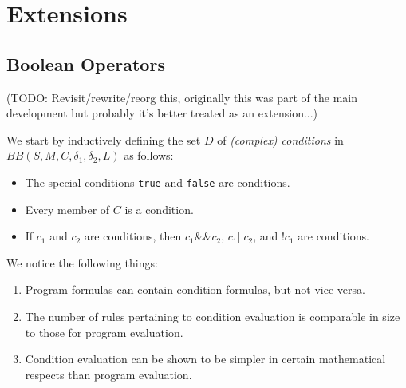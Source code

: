 \documentclass[11pt]{article}
\begin{document}
\begin{comment}
\newtheorem*{determinism}{Theorem}
\begin{determinism}
The evaluation of a Generalized While program is deterministic.
\end{determinism}

\begin{proof}
(TODO: PROVE)
\end{proof}

\newtheorem*{passisuniquelynormal}{Theorem}
\begin{passisuniquelynormal}
No program except for \texttt{pass} is normal.
\end{passisuniquelynormal}

\begin{proof}
(TODO: Do proof...)
\end{proof}

\end{comment}

\section{Extensions}

\subsection{Boolean Operators}

(TODO: Revisit/rewrite/reorg this, originally this was part of the main development but probably it's better treated as an extension...)

We start by inductively defining the set $D$ of \emph{(complex) conditions} in $BB(S, M, C, \delta_{1}, \delta_{2}, L)$ as follows:

\begin{itemize}
\item The special conditions \texttt{true} and \texttt{false} are conditions.
\item Every member of $C$ is a condition.
\item If $c_{1}$ and $c_{2}$ are conditions, then $c_{1} \texttt{\&\&} c_{2}$, $c_{1} \texttt{||} c_{2}$, and $\texttt{!} c_{1}$ are conditions.
\end{itemize}

We notice the following things:
\begin{enumerate}
\item Program formulas can contain condition formulas, but not vice versa.
\item The number of rules pertaining to condition evaluation is comparable in size to those for program evaluation.
\item Condition evaluation can be shown to be simpler in certain mathematical respects than program evaluation.
\end{enumerate}
\end{document}
